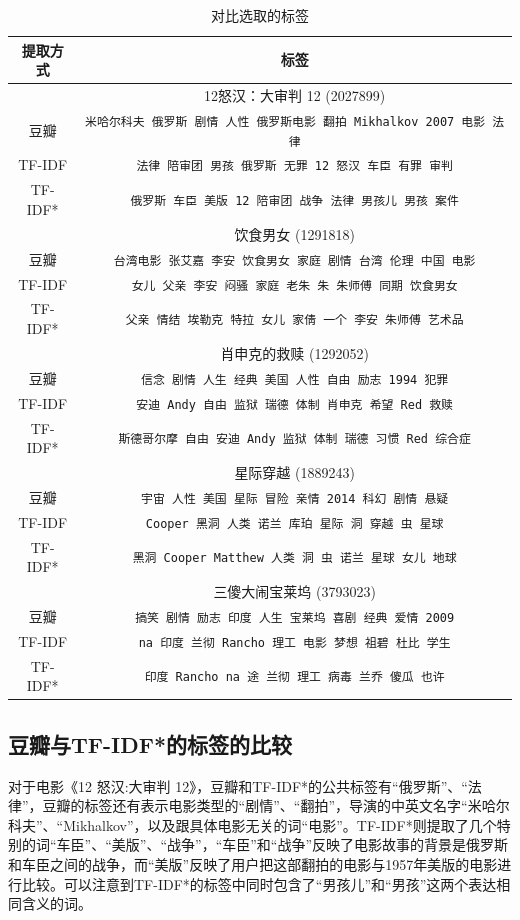 \documentclass[a4paper, nofonts, nocap]{ctexart}
\begin{document}
\begin{table}[ht]
	\centering
	\begin{tabular}{c|c}
		\toprule
		提取方式 & 标签\\
		\midrule
		& 12怒汉：大审判 12 \quad (2027899)\\
		豆瓣 & \verb|米哈尔科夫 俄罗斯 剧情 人性 俄罗斯电影 翻拍 Mikhalkov 2007 电影 法律| \\
		TF-IDF & \verb|法律 陪审团 男孩 俄罗斯 无罪 12 怒汉 车臣 有罪 审判| \\
		TF-IDF* & \verb|俄罗斯 车臣 美版 12 陪审团 战争 法律 男孩儿 男孩 案件| \\
		\midrule
		& 饮食男女 \quad (1291818)\\
		豆瓣 & \verb|台湾电影 张艾嘉 李安 饮食男女 家庭 剧情 台湾 伦理 中国 电影| \\
		TF-IDF & \verb|女儿 父亲 李安 闷骚 家庭 老朱 朱 朱师傅 同期 饮食男女| \\
		TF-IDF* & \verb|父亲 情结 埃勒克 特拉 女儿 家倩 一个 李安 朱师傅 艺术品| \\
		\midrule
		& 肖申克的救赎 \quad (1292052)\\
		豆瓣 & \verb|信念 剧情 人生 经典 美国 人性 自由 励志 1994 犯罪| \\
		TF-IDF & \verb|安迪 Andy 自由 监狱 瑞德 体制 肖申克 希望 Red 救赎| \\
		TF-IDF* & \verb|斯德哥尔摩 自由 安迪 Andy 监狱 体制 瑞德 习惯 Red 综合症| \\
		\midrule
		& 星际穿越 \quad (1889243)\\
		豆瓣 & \verb|宇宙 人性 美国 星际 冒险 亲情 2014 科幻 剧情 悬疑| \\
		TF-IDF & \verb|Cooper 黑洞 人类 诺兰 库珀 星际 洞 穿越 虫 星球| \\
		TF-IDF* & \verb|黑洞 Cooper Matthew 人类 洞 虫 诺兰 星球 女儿 地球| \\
		\midrule
		& 三傻大闹宝莱坞 \quad (3793023)\\
		豆瓣 & \verb|搞笑 剧情 励志 印度 人生 宝莱坞 喜剧 经典 爱情 2009| \\
		TF-IDF & \verb|na 印度 兰彻 Rancho 理工 电影 梦想 祖碧 杜比 学生| \\
		TF-IDF* & \verb|印度 Rancho na 途 兰彻 理工 病毒 兰乔 傻瓜 也许| \\
		\bottomrule
	\end{tabular}
	\caption{对比选取的标签}
	\label{table:label}
\end{table}

\subsection{豆瓣与TF-IDF*的标签的比较}
对于电影《12 怒汉:大审判 12》，豆瓣和TF-IDF*的公共标签有“俄罗斯”、“法律”，豆瓣的标签还有表示电影类型的“剧情”、“翻拍”，导演的中英文名字“米哈尔科夫”、“Mikhalkov”，以及跟具体电影无关的词“电影”。TF-IDF*则提取了几个特别的词“车臣”、“美版”、“战争”，“车臣”和“战争”反映了电影故事的背景是俄罗斯和车臣之间的战争，而“美版”反映了用户把这部翻拍的电影与1957年美版的电影进行比较。可以注意到TF-IDF*的标签中同时包含了“男孩儿”和“男孩”这两个表达相同含义的词。
\end{document}
